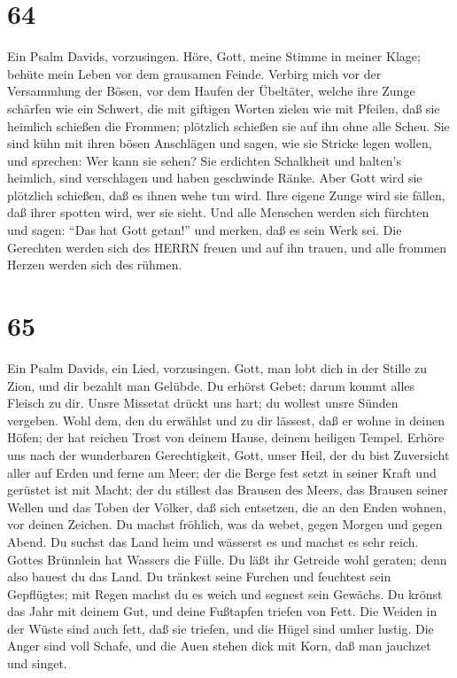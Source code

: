 \hypertarget{section-63}{%
\section{64}\label{section-63}}

 Ein Psalm Davids, vorzusingen. Höre, Gott, meine Stimme in
meiner Klage; behüte mein Leben vor dem grausamen Feinde. 
Verbirg mich vor der Versammlung der Bösen, vor dem Haufen der
Übeltäter,  welche ihre Zunge schärfen wie ein Schwert, die
mit giftigen Worten zielen wie mit Pfeilen,  daß sie
heimlich schießen die Frommen; plötzlich schießen sie auf ihn ohne alle
Scheu.  Sie sind kühn mit ihren bösen Anschlägen und sagen,
wie sie Stricke legen wollen, und sprechen: Wer kann sie sehen?
 Sie erdichten Schalkheit und halten's heimlich, sind
verschlagen und haben geschwinde Ränke.  Aber Gott wird sie
plötzlich schießen, daß es ihnen wehe tun wird.  Ihre eigene
Zunge wird sie fällen, daß ihrer spotten wird, wer sie sieht.
 Und alle Menschen werden sich fürchten und sagen: ``Das hat
Gott getan!'' und merken, daß es sein Werk sei.  Die
Gerechten werden sich des HERRN freuen und auf ihn trauen, und alle
frommen Herzen werden sich des rühmen.

\hypertarget{section-64}{%
\section{65}\label{section-64}}

 Ein Psalm Davids, ein Lied, vorzusingen. Gott, man lobt
dich in der Stille zu Zion, und dir bezahlt man Gelübde.  Du
erhörst Gebet; darum kommt alles Fleisch zu dir.  Unsre
Missetat drückt uns hart; du wollest unsre Sünden vergeben. 
Wohl dem, den du erwählst und zu dir lässest, daß er wohne in deinen
Höfen; der hat reichen Trost von deinem Hause, deinem heiligen Tempel.
 Erhöre uns nach der wunderbaren Gerechtigkeit, Gott, unser
Heil, der du bist Zuversicht aller auf Erden und ferne am Meer;
 der die Berge fest setzt in seiner Kraft und gerüstet ist
mit Macht;  der du stillest das Brausen des Meers, das
Brausen seiner Wellen und das Toben der Völker,  daß sich
entsetzen, die an den Enden wohnen, vor deinen Zeichen. Du machst
fröhlich, was da webet, gegen Morgen und gegen Abend.  Du
suchst das Land heim und wässerst es und machst es sehr reich. Gottes
Brünnlein hat Wassers die Fülle. Du läßt ihr Getreide wohl geraten; denn
also bauest du das Land.  Du tränkest seine Furchen und
feuchtest sein Gepflügtes; mit Regen machst du es weich und segnest sein
Gewächs.  Du krönst das Jahr mit deinem Gut, und deine
Fußtapfen triefen von Fett.  Die Weiden in der Wüste sind
auch fett, daß sie triefen, und die Hügel sind umher lustig.
 Die Anger sind voll Schafe, und die Auen stehen dick mit
Korn, daß man jauchzet und singet.

